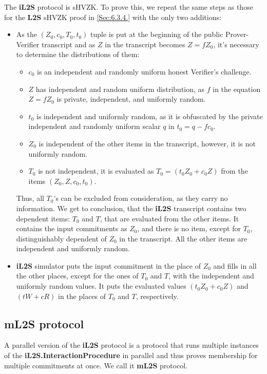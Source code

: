 \documentclass{mathcryptology} %
\theoremstyle{title}
\theoremstyle{titleof}
\begin{document}
    The \textbf{iL2S} protocol is sHVZK. To prove this, we repeat the same steps as those for the \textbf{L2S} sHVZK proof in \ref{Sec:6.3.4.} with the only two additions:
    \begin{itemize}
        \item As the $\left(Z_{0}, c_{0}, T_{0}, {t}_{0}\right)$ tuple is put at the beginning of the public Prover-Verifier transcript and as $Z$ in the transcript becomes $Z=fZ_{0}$, it's necessary to determine the distributions of them:
        \begin{itemize}
            \item $c_{0}$ is an independent and randomly uniform honest Verifier's challenge.
            \item $Z$ has independent and random uniform distribution, as $f$ in the equation $Z=fZ_{0}$ is private, independent, and uniformly random.
            \item $t_{0}$ is independent and uniformly random, as it is obfuscated by the private independent and randomly uniform scalar $q$ in $t_{0}=q-fc_{0}$.
            \item $Z_{0}$ is independent of the other items in the transcript, however, it is not uniformly random.
            \item $T_{0}$ is not independent, it is evaluated as $T_{0} = \left(t_{0} Z_{0} +c_{0} Z\right)$ from the items $\left(Z_{0},Z,c_{0},t_{0}\right)$.
        \end{itemize}
        Thus, all $T_{0}$'s can be excluded from consideration, as they carry no information. We get to conclusion, that the \textbf{iL2S} transcript contains two dependent items: $T_{0}$ and $T$, that are evaluated from the other items. It contains the input commitments as $Z_{0}$, and there is no item, except for $T_{0}$, distinguishably dependent of $Z_{0}$ in the transcript. All the other items are independent and uniformly random.
        \item \textbf{iL2S} simulator puts the input commitment in the place of $Z_{0}$ and fills in all the other places, except for the ones of $T_{0}$ and $T$, with the independent and uniformly random values. It puts the evaluated values $\left(t_{0} Z_{0} + c_{0}Z\right)$ and $\left(tW+cR\right)$ in the places of $T_{0}$ and $T$, respectively.
    \end{itemize}


\subsection{mL2S protocol}\label{Sec:7.2.}
    A parallel version of the \textbf{iL2S} protocol is a protocol that runs multiple instances of the \textbf{iL2S.InteractionProcedure} in parallel and thus proves membership for multiple commitments at once. We call it \textbf{mL2S} protocol.
\end{document}
